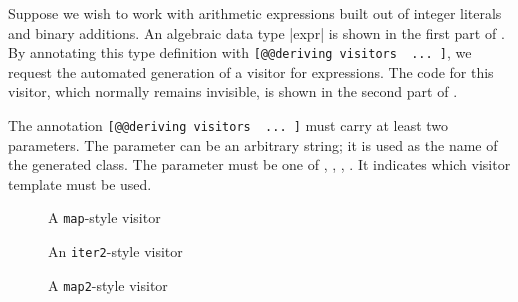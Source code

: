 \documentclass[onecolumn,11pt,nocopyrightspace]{sigplanconf}
\begin{document}
Suppose we wish to work with arithmetic expressions built out of integer
literals and binary additions. An algebraic data type \oc|expr| is shown in
the first part of . By annotating this type definition with
\texttt{[@@deriving visitors { ... }]}, we request the automated generation of
a visitor for expressions. The code for this visitor, which normally remains
invisible, is shown in the second part of .

The annotation \texttt{[@@deriving visitors { ... }]} must carry at least two
parameters. The parameter \name can be an arbitrary string; it is used as the
name of the generated class. The parameter \variety must be one of \iter,
\map, \itertwo, \maptwo. It indicates which visitor template must be used.


\begin{figure}[t]
\vspace{-\baselineskip}
\caption{A \texttt{map}-style visitor}
\label{fig:expr01}
\end{figure}


\begin{figure}[t]
\vspace{-\baselineskip}
\caption{An \texttt{iter2}-style visitor}
\label{fig:expr02}
\end{figure}


\begin{figure}[t]
\vspace{-\baselineskip}
\caption{A \texttt{map2}-style visitor}
\label{fig:expr03}
\end{figure}

\end{document}
